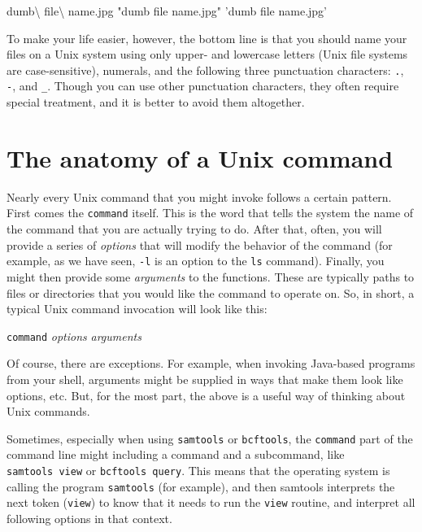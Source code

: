 \documentclass[]{krantz}
\makeatletter
\newenvironment{Shaded}{\begin{snugshade}}{\end{snugshade}}
\newcommand{\ExtensionTok}[1]{#1}
\newcommand{\StringTok}[1]{\textcolor[rgb]{0.5,0.5,0.5}{#1}}
\newenvironment{kframe}{%
\medskip{}
\setlength{\fboxsep}{.8em}
 \def\at@end@of@kframe{}%
 \ifinner\ifhmode%
  \def\at@end@of@kframe{\end{minipage}}%
  \begin{minipage}{\columnwidth}%
 \fi\fi%
 \def\FrameCommand##1{\hskip\@totalleftmargin \hskip-\fboxsep
 \colorbox{shadecolor}{##1}\hskip-\fboxsep
     \hskip-\linewidth \hskip-\@totalleftmargin \hskip\columnwidth}%
 \MakeFramed {\advance\hsize-\width
   \@totalleftmargin\z@ \linewidth\hsize
   \@setminipage}}%
 {\par\unskip\endMakeFramed%
 \at@end@of@kframe}
\renewenvironment{Shaded}{\begin{kframe}}{\end{kframe}}
\makeatother
\begin{document}
\begin{Shaded}
\begin{Highlighting}[]
\ExtensionTok{dumb\textbackslash{} file\textbackslash{} name.jpg}
\StringTok{"dumb file name.jpg"}
\StringTok{'dumb file name.jpg'}
\end{Highlighting}
\end{Shaded}

To make your life easier, however, the bottom line is that you should name your files
on a Unix system using only upper- and lowercase letters (Unix file systems are
case-sensitive), numerals, and the following three punctuation characters: \texttt{.}, \texttt{-}, and \texttt{\_}.
Though you can use other punctuation characters, they often require special treatment, and it
is better to avoid them altogether.

\hypertarget{the-anatomy-of-a-unix-command}{%
\section{The anatomy of a Unix command}\label{the-anatomy-of-a-unix-command}}

Nearly every Unix command that you might invoke follows a certain pattern. First comes
the \texttt{command} itself. This is the word that tells the system the name of the command
that you are actually trying to do. After that, often, you will provide a series
of \emph{options} that will modify the behavior of the command (for example, as we have seen, \texttt{-l}
is an option to the \texttt{ls} command). Finally, you might then provide some \emph{arguments} to the
functions. These are typically paths to files or directories that you would like the
command to operate on. So, in short, a typical Unix command invocation will look
like this:

\texttt{command} \emph{options} \emph{arguments}

Of course, there are exceptions. For example, when invoking Java-based programs from your
shell, arguments might be supplied in ways that make them look like options, etc. But, for
the most part, the above is a useful way of thinking about Unix commands.

Sometimes, especially when using \texttt{samtools} or \texttt{bcftools}, the \texttt{command} part of the
command line might including a command and a subcommand, like \texttt{samtools\ view} or
\texttt{bcftools\ query}. This means that the operating system is calling the program
\texttt{samtools} (for example), and then samtools interprets the next token (\texttt{view}) to
know that it needs to run the \texttt{view} routine, and interpret all following
options in that context.
\end{document}
